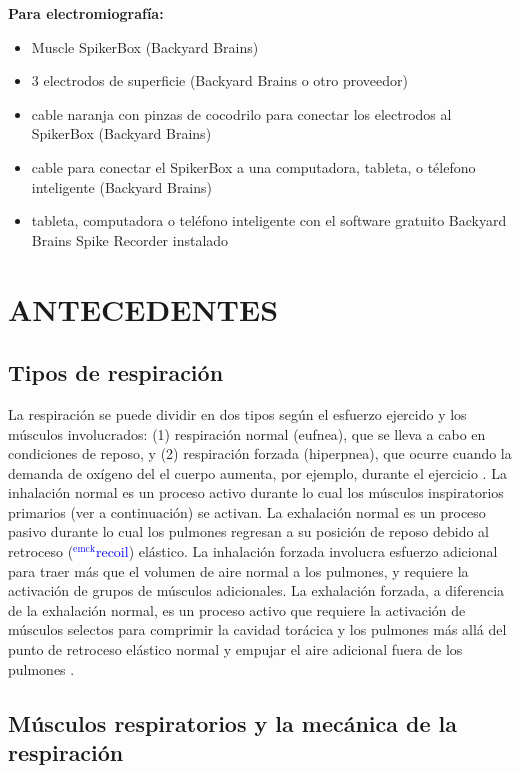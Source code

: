 \documentclass[12pt]{article}
\newcommand{\emck}[1]{\textcolor{blue}{$^{\textrm{emck}}${#1}}}
\begin{document}
\vspace{0.3cm}

\textbf{Para electromiografía:}
 \begin{itemize}
	\item Muscle SpikerBox (Backyard Brains)
        \item 3 electrodos de superficie (Backyard Brains o otro proveedor)
        \item cable naranja con pinzas de cocodrilo para conectar los electrodos al SpikerBox (Backyard
Brains)
    \item cable para conectar el SpikerBox a una computadora, tableta, o télefono inteligente (Backyard
Brains)
 	\item tableta, computadora o teléfono inteligente con el software gratuito Backyard Brains Spike
Recorder instalado
\end{itemize}


\section*{ANTECEDENTES}

\subsection*{Tipos de respiración}

La respiración se puede dividir en dos tipos según el esfuerzo
ejercido y los músculos involucrados: (1) respiración normal (eufnea),
que se lleva a cabo en condiciones de reposo, y (2) respiración
forzada (hiperpnea), que ocurre cuando la demanda de oxígeno del el
cuerpo aumenta, por ejemplo, durante el ejercicio
\cite{openStax2016resp}. La inhalación normal es un proceso activo
durante lo cual los músculos inspiratorios primarios (ver a continuación) se
activan. La exhalación normal es un proceso pasivo durante lo cual los
pulmones regresan a su posición de reposo debido al retroceso (\emck{recoil})
elástico. La inhalación forzada involucra esfuerzo adicional para
traer más que el volumen de aire normal a los pulmones, y requiere la
activación de grupos de músculos adicionales. La exhalación forzada, a
diferencia de la exhalación normal, es un proceso activo que requiere
la activación de músculos selectos para comprimir la cavidad torácica
 y los pulmones más allá del punto de retroceso elástico normal y
empujar el aire adicional fuera de los pulmones \cite{openStax2016resp}.

\subsection*{Músculos respiratorios y la mecánica de la respiración}
\end{document}
